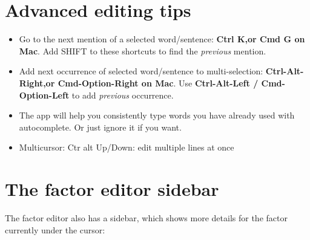 \documentclass[
]{book}
\providecommand{\tightlist}{%
  \setlength{\itemsep}{0pt}\setlength{\parskip}{0pt}}
\begin{document}
\hypertarget{advanced-editing-tips}{%
\section{Advanced editing tips}\label{advanced-editing-tips}}

\begin{itemize}
\tightlist
\item
  Go to the next mention of a selected word/sentence: \textbf{Ctrl K,or Cmd G on Mac}. Add SHIFT to these shortcuts to find the \emph{previous} mention.
\item
  Add next occurrence of selected word/sentence to multi-selection: \textbf{Ctrl-Alt-Right,or Cmd-Option-Right on Mac}. Use \textbf{Ctrl-Alt-Left / Cmd-Option-Left} to add \emph{previous} occurrence.
\item
  The app will help you consistently type words you have already used with autocomplete. Or just ignore it if you want.
\item
  Multicursor: Ctr alt Up/Down: edit multiple lines at once
\end{itemize}

\hypertarget{xfactor-editor-sidebar}{%
\section{The factor editor sidebar}\label{xfactor-editor-sidebar}}

The factor editor also has a sidebar, which shows more details for the factor currently under the cursor:
\end{document}
